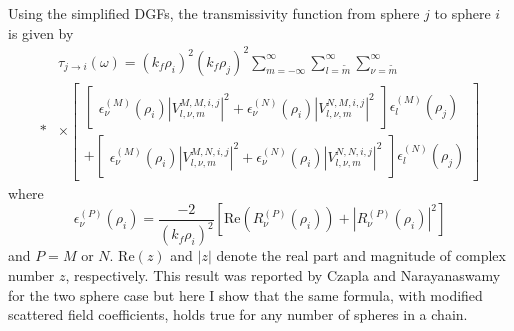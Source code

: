 Using the simplified DGFs, the transmissivity function from sphere $j$ to sphere $i$ is given by 
%
\begin{equation} \label{eq:Transmissivity_SphereSphere}
\begin{split}
& \tau_{j \rightarrow i}\left( \omega \right)
= \left( k_{f} \rho_{i} \right)^{2} \left( k_{f} \rho_{j} \right)^{2} \sum\limits_{m=-\infty}^{\infty} \sum\limits_{l=\widetilde{m}}^{\infty}\sum_{\nu = \widetilde{m}}^{\infty}
\\*
& \times \left[ \! \! \begin{array}{r}
\left[ \! \! \begin{array}{r}
\epsilon_{\nu}^{(M)}(\rho_{i})
\left| V_{l,\nu,m}^{M,M,i,j} \right|^{2}
+ \epsilon_{\nu}^{(N)}(\rho_{i})
\left| V_{l,\nu,m}^{N,M,i,j} \right|^{2}
\end{array} \! \! \right]
\epsilon_{l}^{(M)}(\rho_{j})
\\
+ \left[ \! \! \begin{array}{r}
\epsilon_{\nu}^{(M)}(\rho_{i})
\left| V_{l,\nu,m}^{M,N,i,j} \right|^{2}
+ \epsilon_{\nu}^{(N)}(\rho_{i})
\left| V_{l,\nu,m}^{N,N,i,j} \right|^{2}
\end{array} \! \! \right]
\epsilon_{l}^{(N)}(\rho_{j})
\end{array} \! \! \right]
\end{split}
\end{equation}
%
where
\begin{equation}
\epsilon_{\nu}^{(P)}(\rho_{i}) = \frac{-2}{\left( k_{f} \rho_{i} \right)^{2}} \left[ \mathrm{Re} \left( R_{\nu}^{(P)}(\rho_{i}) \right) + \left| R_{\nu}^{(P)}(\rho_{i}) \right|^{2} \right]
\end{equation}
%
and $P=M$ or $N$. $\mathrm{Re}(z)$ and $\left| z \right|$ denote the real part and magnitude of complex number $z$, respectively. This result was reported by Czapla and Narayanaswamy\cite{Czapla2017} for the two sphere case but here I show that the same formula, with modified scattered field coefficients, holds true for any number of spheres in a chain.

